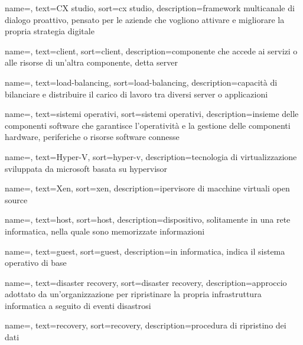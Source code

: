 {
    name=,
    text=CX studio,
    sort=cx studio, 
    description={framework multicanale di dialogo proattivo, pensato per le aziende che vogliono attivare e migliorare la propria strategia digitale}
}

{
    name=,
    text=client,
    sort=client, 
    description={componente che accede ai servizi o alle risorse di un'altra componente, detta server}
}

{
    name=,
    text=load-balancing,
    sort=load-balancing, 
    description={capacità di bilanciare e distribuire il carico di lavoro tra diversi server o applicazioni}
}

{
    name=,
    text=sistemi operativi,
    sort=sistemi operativi, 
    description={insieme delle componenti software che garantisce l'operatività e la gestione delle componenti hardware, periferiche o risorse software connesse}
}

{
    name=,
    text=Hyper-V,
    sort=hyper-v, 
    description={tecnologia di virtualizzazione sviluppata da microsoft basata su hypervisor}
}

{
    name=,
    text=Xen,
    sort=xen, 
    description={ipervisore di macchine virtuali open source}
}

{
    name=,
    text=host,
    sort=host, 
    description={dispositivo, solitamente in una rete informatica, nella quale sono memorizzate informazioni}
}

{
    name=,
    text=guest,
    sort=guest, 
    description={in informatica, indica il sistema operativo di base}
}

{
    name=,
    text=disaster recovery,
    sort=disaster recovery, 
    description={approccio adottato da un'organizzazione per ripristinare la propria infrastruttura informatica a seguito di eventi disastrosi}
}

{
    name=,
    text=recovery,
    sort=recovery, 
    description={procedura di ripristino dei dati}
}

